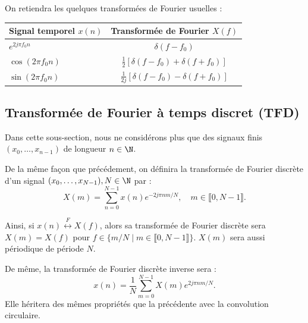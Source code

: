 \begin{proposition}
    On retiendra les quelques transformées de Fourier usuelles : 
    \begin{center}
        \renewcommand{\arraystretch}{2.2} %
        \begin{tabular}{lc} %
            \toprule
            \textbf{Signal temporel} $x(n)$ & \textbf{Transformée de Fourier} $X(f)$ \\ 
            \midrule
            $e^{2 j \pi f_0 n}$ & $\delta(f - f_0)$ \\ 
            $\cos(2 \pi f_0 n)$ & $\displaystyle \frac{1}{2} [ \delta(f - f_0) + \delta(f + f_0)]$ \\ 
            $\sin(2 \pi f_0 n)$ & $\displaystyle \frac{1}{2j} [ \delta(f - f_0) - \delta(f + f_0)]$ \\ 
            \bottomrule
        \end{tabular}
    \end{center}
\end{proposition}

\subsection{Transformée de Fourier à temps discret (TFD)}

Dans cette sous-section, nous ne considérons plus que des signaux 
finis $(x_0, \dots, x_{n-1})$ de longueur $ n \in \N$. 

\begin{definition}
    De la même façon que précédement, on définira la transformée de Fourier discrète 
    d'un signal $(x_0, \dots, x_{N-1}), N \in \N$ par : 
        $$ 
            \boxed{X(m) = \sum_{n=0}^{N-1} x(n) e^{-2 j \pi  n m / N}, \quad m \in \llbracket 0, N-1 \rrbracket.}
        $$ 
\end{definition}

\begin{remark}
    Ainsi, si $ x(n) \overset{F}{\longleftrightarrow} X(f)$, alors 
    sa transformée de Fourier discrète sera $X(m) = X(f)$ pour $ f \in \{m/N \mid m \in \llbracket 0, N-1 \rrbracket\}$. 
    $X(m)$ sera aussi périodique de période $ N$. 
\end{remark}

\begin{proposition}
    De même, la transformée de Fourier discrète inverse sera : 
        $$ x(n) = \frac{1}{N} \sum_{m=0}^{N-1} X(m) e^{2 j \pi n m / N}. $$ 
    Elle héritera des mêmes propriétés que la précédente avec la convolution circulaire. 
\end{proposition}


